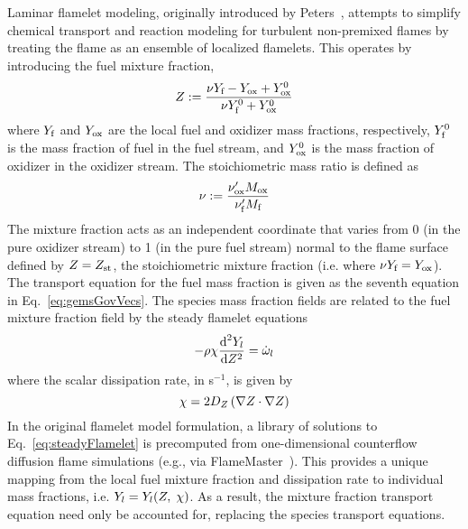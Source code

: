 Laminar flamelet modeling, originally introduced by Peters~\cite{Peters1984}, attempts to simplify chemical transport and reaction modeling for turbulent non-premixed flames by treating the flame as an ensemble of localized flamelets. This operates by introducing the fuel mixture fraction,
%
\begin{equation}\label{eq:mixFracDef}
    Z := \frac{ \nu Y_{\text{f}} - Y_{\text{ox}} + Y^0_{\text{ox}} }{ \nu Y^0_{\text{f}} + Y^0_{\text{ox}} }
\end{equation}
%
where $Y_{\text{f}}$ and $Y_{\text{ox}}$ are the local fuel and oxidizer mass fractions, respectively, $Y^0_{\text{f}}$ is the mass fraction of fuel in the fuel stream, and $Y^0_{\text{ox}}$ is the mass fraction of oxidizer in the oxidizer stream. The stoichiometric mass ratio is defined as
%
\begin{equation}
	\nu := \frac{\nu'_{\text{ox}} M_{\text{ox}}}{\nu'_{\text{f}} M_{\text{f}}}
\end{equation}
%
The mixture fraction acts as an independent coordinate that varies from 0 (in the pure oxidizer stream) to 1 (in the pure fuel stream) normal to the flame surface defined by $Z = Z_{\text{st}}$, the stoichiometric mixture fraction (i.e. where $\nu Y_{\text{f}} = Y_{\text{ox}}$). The transport equation for the fuel mass fraction is given as the seventh equation in Eq.~\ref{eq:gemsGovVecs}. The species mass fraction fields are related to the fuel mixture fraction field by the steady flamelet equations
%
\begin{equation}\label{eq:steadyFlamelet}
	-\rho \chi \frac{\text{d} ^2 Y_{l}}{\text{d} Z^2} = \dot{\omega}_{l}
\end{equation}
%
where the scalar dissipation rate, in s$^{-1}$, is given by
\begin{equation}
	\chi = 2 D_{Z} \left(\nabla Z \cdot \nabla Z\right)
\end{equation}
%
In the original flamelet model formulation, a library of solutions to Eq.~\ref{eq:steadyFlamelet} is precomputed from one-dimensional counterflow diffusion flame simulations (e.g., via FlameMaster~\cite{flamemaster}). This provides a unique mapping from the local fuel mixture fraction and dissipation rate to individual mass fractions, i.e. $Y_{l} = Y_{l}(Z, \; \chi)$. As a result, the mixture fraction transport equation need only be accounted for, replacing the species transport equations.

